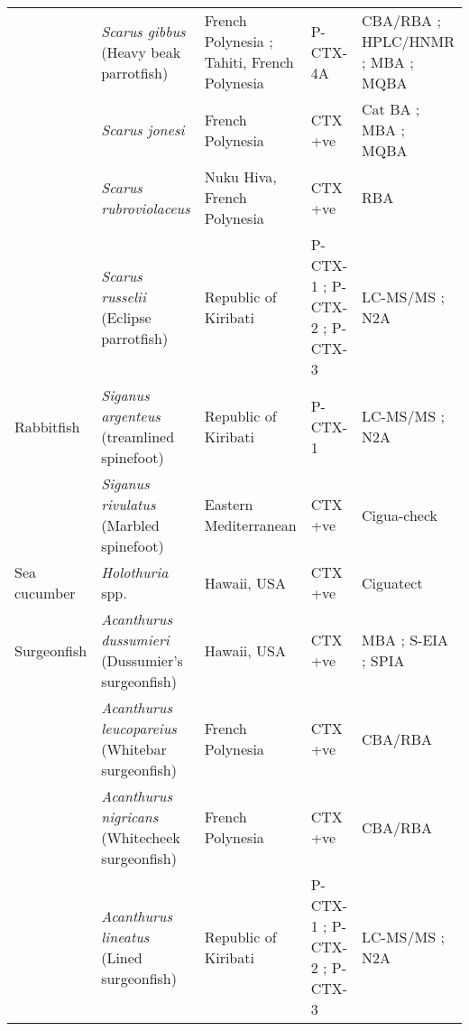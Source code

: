 \documentclass[12pt]{article}
\begin{document}
\begin{longtable}{ | p{2cm} | p{3cm} | p{4.5cm} | p{2cm} | p{3cm} | }
	& \emph{Scarus gibbus} (Heavy beak parrotfish) & French Polynesia \cite{bagnis1987use,satake1996isolation,chinain2014mail}; Tahiti, French Polynesia \cite{pompon1983ciguatera} & P-CTX-4A \cite{satake1996isolation} & CBA/RBA \cite{chinain2014mail}; HPLC/HNMR \cite{satake1996isolation}; MBA \cite{bagnis1987use,satake1996isolation,pompon1983ciguatera}; MQBA \cite{bagnis1987use} \\
	& \emph{Scarus jonesi} & French Polynesia \cite{bagnis1987use} & CTX +ve \cite{bagnis1987use} & Cat BA \cite{bagnis1987use}; MBA \cite{bagnis1987use}; MQBA \cite{bagnis1987use} \\
	& \emph{Scarus rubroviolaceus} & Nuku Hiva, French Polynesia \cite{darius2007ciguatera} & CTX +ve \cite{darius2007ciguatera} & RBA \cite{darius2007ciguatera}\\
	& \emph{Scarus russelii} (Eclipse parrotfish) & Republic of Kiribati \cite{mak2013pacific} & P-CTX-1 \cite{mak2013pacific}; P-CTX-2 \cite{mak2013pacific}; P-CTX-3 \cite{mak2013pacific} & LC-MS/MS \cite{mak2013pacific}; N2A \cite{mak2013pacific} \\
    \hline
	Rabbitfish & \emph{Siganus argenteus} (treamlined spinefoot) & Republic of Kiribati \cite{mak2013pacific} & P-CTX-1 \cite{mak2013pacific} & LC-MS/MS \cite{mak2013pacific}; N2A \cite{mak2013pacific} \\
	 & \emph{Siganus rivulatus} (Marbled spinefoot) & Eastern Mediterranean \cite{bentur2007ciguatoxin} & CTX +ve \cite{bentur2007ciguatoxin} & Cigua-check \textregistered \cite{bentur2007ciguatoxin}\\
	\hline
	Sea cucumber & \emph{Holothuria} spp. & Hawaii, USA \cite{park2000microbial} & CTX +ve \cite{park2000microbial} & Ciguatect \textregistered \cite{park2000microbial} \\
	\hline
	Surgeonfish &\emph{Acanthurus dussumieri} (Dussumier's surgeonfish) & Hawaii, USA \cite{hokama1993evaluation} & CTX +ve \cite{hokama1993evaluation} & MBA \cite{hokama1993evaluation}; S-EIA \cite{hokama1993evaluation}; SPIA \cite{hokama1993evaluation} \\
	& \emph{Acanthurus leucopareius} (Whitebar surgeonfish) & French Polynesia \cite{chinain2014mail} & CTX +ve \cite{chinain2014mail} & CBA/RBA \cite{chinain2014mail} \\ & \emph{Acanthurus nigricans} (Whitecheek surgeonfish) & French Polynesia \cite{chinain2014mail} & CTX +ve \cite{chinain2014mail} & CBA/RBA \cite{chinain2014mail} \\
	& \emph{Acanthurus lineatus} (Lined surgeonfish) & Republic of Kiribati \cite{mak2013pacific} & P-CTX-1 \cite{mak2013pacific}; P-CTX-2 \cite{mak2013pacific}; P-CTX-3 \cite{mak2013pacific} & LC-MS/MS \cite{mak2013pacific}; N2A \cite{mak2013pacific} \\

\end{longtable}
\end{document}
